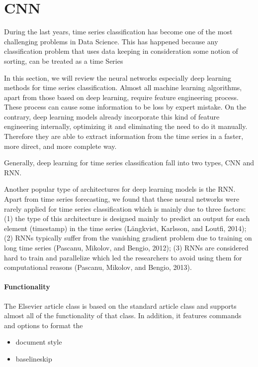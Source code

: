 \section{CNN}

During the last years, time series classification has become one of the most challenging problems in Data Science. This has happened because any classification problem that uses data keeping in consideration some notion of sorting, can be treated as a time Series


In this section, we will review the neural networks especially deep learning methods for time series classification. 
Almost all machine learning algorithms, apart from those based on deep learning, require feature engineering process. These process can cause some information to be loss by expert mistake. On the contrary, deep learning models already incorporate this kind of feature engineering internally, optimizing it and eliminating the need to do it manually. Therefore they are able to extract information from the time series in a faster, more direct, and more complete way.





Generally, deep learning for time series classification fall into two types, CNN and RNN.

Another popular type of architectures for deep learning models is the RNN. Apart from time series forecasting, we found that these neural networks were rarely applied for time series classification which is mainly due to three factors: (1) the type
of this architecture is designed mainly to predict an output for each element (timestamp) in the time series (Längkvist, Karlsson, and Loutfi, 2014); (2) RNNs typically suffer from the vanishing gradient problem due to training on long time series (Pascanu, Mikolov, and Bengio, 2012); (3) RNNs are considered hard to train
and parallelize which led the researchers to avoid using them for computational reasons (Pascanu, Mikolov, and Bengio, 2013).


\paragraph{Functionality} The Elsevier article class is based on the standard article class and supports almost all of the functionality of that class. In addition, it features commands and options to format the
\begin{itemize}%
\item document style
\item baselineskip
\end{itemize}



